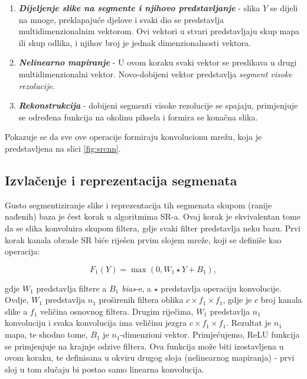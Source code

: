 \documentclass[12pt]{report}
\numberwithin{equation}{section}
\begin{document}
\begin{enumerate}

 \item \textbf{\textit{Dijeljenje slike na segmente i njihovo predstavljanje}} - slika $Y$ se dijeli na mnoge, preklapajuće djelove i svaki dio se predstavlja multidimenzionalnim vektorom. Ovi vektori u stvari predstavljaju skup mapa ili skup odlika, i njihov broj je jednak dimenzionalnosti vektora. 
  
 \item \textbf{\textit{Nelinearno mapiranje}} - U ovom koraku svaki vektor se preslikava u drugi multidimenzionalni vektor. Novo-dobijeni vektor predstavlja \textit{segment visoke rezolucije}.
  
 \item \textbf{\textit{Rekonstrukcija}} - dobijeni segmenti visoke rezolucije se spajaju, primjenjuje se određena funkcija na okolinu piksela i formira se konačna slika. 

\end{enumerate}
Pokazuje se da sve ove operacije formiraju konvolucionu mrežu, koja je predstavljena na slici \ref{fig:srcnn}.


\subsection{Izvlačenje i reprezentacija segmenata}


Gusto segmentiziranje slike i reprezentacija tih segmenata skupom (ranije nađenih) baza je čest korak u algoritmima SR-a. Ovaj korak je ekvivalentan tome da se slika konvoluira skupom filtera, gdje svaki filter predstavlja neku bazu. Prvi korak kanala obrade SR biće riješen prvim slojem mreže, koji se definiše kao operacija:


\begin{equation}
  F_1(Y) = \max(0, W_1 \star Y + B_1),
\end{equation}

gdje $W_1$ predstavlja filtere a $B_1$ \textit{bias}-e, a $\star$ predstavlja operaciju konvolucije. Ovdje, $W_1$ predstavlja $n_1$ proširenih filtera oblika $c \times f_1 \times f_1$, gdje je $c$ broj kanala slike a $f_1$ veličina osnovnog filtera. Drugim riječima, $W_1$ predstavlja $n_1$ konvoluciju i svaka konvolucija ima veličinu jezgra $c \times f_1 \times f_1$. Rezultat je $n_1$ mapa, te shodno tome, $B_1$ je $n_1$-dimenzioni vektor. Primjećujemo, ReLU funkcija se primjenjuje na krajnje odzive filtera.  Ova funkcija može biti izostavljena u ovom koraku, te definisana u okviru drugog sloja (nelinearnog mapiranja) - prvi sloj u tom slučaju bi postao samo linearna konvolucija.
\end{document}
